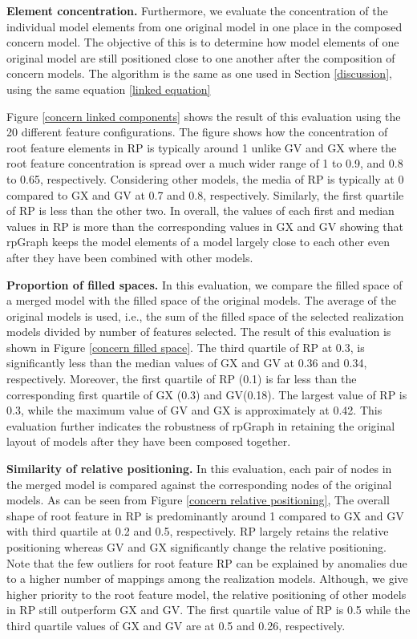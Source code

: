 \textbf{Element concentration.}  Furthermore, we evaluate the concentration of the individual model elements from one original model in one place in the composed concern model. The objective of this is to determine how model elements of one original model are still positioned close to one another after the composition of concern models. The algorithm is the same as one used in Section \ref{discussion}, using the same equation \ref{linked equation}

Figure \ref{concern linked components} shows the result of this evaluation using the 20 different feature configurations. The figure shows how the concentration of root feature elements in RP is typically around 1 unlike GV and GX where the root feature concentration is spread over a much wider range of 1 to 0.9, and 0.8 to 0.65, respectively. Considering other models, the media of RP is typically at 0 compared to GX and GV at 0.7 and 0.8, respectively. Similarly, the first quartile of RP is less than the other two. In overall, the values of each first and median values in RP is more than the corresponding values in GX and GV  showing that rpGraph keeps the model elements of a model largely close to each other even after they have been combined with other models.

\textbf{Proportion of filled spaces.} In this evaluation, we compare the filled space of a merged model with the filled space of the original models. The average of the original models is used, i.e., the sum of the filled space of the selected realization models divided by number of features selected. The result of this evaluation is shown in Figure \ref{concern filled space}. The third quartile of RP at 0.3, is significantly less than the median values of GX and GV at 0.36 and 0.34, respectively. Moreover, the first quartile of RP (0.1) is far less than the corresponding first quartile of GX (0.3) and GV(0.18). The largest value of RP is 0.3, while the maximum value of GV and GX is approximately at 0.42. This evaluation further indicates the robustness of rpGraph in retaining the original layout of models after they have been composed together.

\textbf{Similarity of relative positioning.} In this evaluation, each pair of nodes in the merged model is compared against the corresponding nodes of the original models.  As can be seen from Figure \ref{concern relative positioning}, The overall shape of root feature in RP is predominantly around 1 compared to GX and GV with third quartile at 0.2 and 0.5, respectively. RP largely retains the relative positioning whereas GV and GX significantly change the relative positioning. Note that the few outliers for root feature RP can be explained by anomalies due to a higher number of mappings among the realization models. Although, we give higher priority to the root feature model, the relative positioning of other models in RP still outperform GX and GV.  The first quartile value of RP is 0.5 while the third quartile values of GX and GV are at 0.5 and 0.26, respectively.

